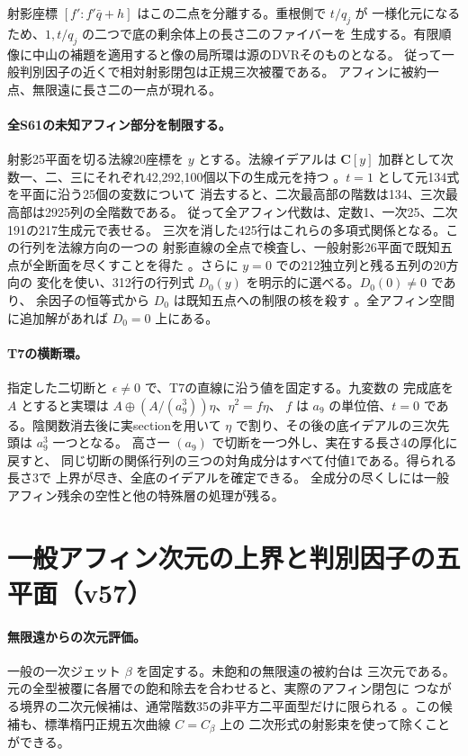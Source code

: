 \documentclass[11pt,a4paper]{ltjsarticle}
\theoremstyle{remark}
\begin{document}
射影座標 $[f':f'\bar q+h]$ はこの二点を分離する。重根側で $t/q_j$ が
一様化元になるため、$1,t/q_j$ の二つで底の剰余体上の長さ二のファイバーを
生成する。有限順像に中山の補題を適用すると像の局所環は源のDVRそのものとなる。
従って一般判別因子の近くで相対射影閉包は正規三次被覆である。
アフィンに被約一点、無限遠に長さ二の一点が現れる。

\paragraph{全S61の未知アフィン部分を制限する。}
射影25平面を切る法線20座標を $y$ とする。法線イデアルは
$\mathbf C[y]$ 加群として次数一、二、三にそれぞれ42,292,100個以下の生成元を持つ
\cite{normal-module-v56}。$t=1$ として元134式を平面に沿う25個の変数について
消去すると、二次最高部の階数は134、三次最高部は2925列の全階数である。
従って全アフィン代数は、定数1、一次25、二次191の217生成元で表せる。
三次を消した425行はこれらの多項式関係となる。この行列を法線方向の一つの
射影直線の全点で検査し、一般射影26平面で既知五点が全断面を尽くすことを得た
\cite{affine-border-v56}。さらに $y=0$ での212独立列と残る五列の20方向の
変化を使い、312行の行列式 $D_0(y)$ を明示的に選べる。$D_0(0)\ne0$ であり、
余因子の恒等式から $D_0$ は既知五点への制限の核を殺す
\cite{affine-ann-v56}。全アフィン空間に追加解があれば $D_0=0$ 上にある。

\paragraph{T7の横断環。}
指定した二切断と $\epsilon\ne0$ で、T7の直線に沿う値を固定する。九変数の
完成底を $A$ とすると実環は $A\oplus(A/(a_9^3))\eta$、$\eta^2=f\eta$、
$f$ は $a_9$ の単位倍、$t=0$ である。陰関数消去後に実sectionを用いて
$\eta$ で割り、その後の底イデアルの三次先頭は $a_9^3$ 一つとなる。
高さ一 $(a_9)$ で切断を一つ外し、実在する長さ4の厚化に戻すと、
同じ切断の関係行列の三つの対角成分はすべて付値1である。得られる長さ3で
上界が尽き、全底のイデアルを確定できる\cite{t7-nine-v56,t7-dvr-v56}。
全成分の尽くしには一般アフィン残余の空性と他の特殊層の処理が残る。

\section{一般アフィン次元の上界と判別因子の五平面（v57）}
\paragraph{無限遠からの次元評価。}
一般の一次ジェット $\beta$ を固定する。未飽和の無限遠の被約台は
三次元である。元の全型被覆に各層での飽和除去を合わせると、実際のアフィン閉包に
つながる境界の二次元候補は、通常階数35の非平方二平面型だけに限られる
\cite{bound-three-v57}。この候補も、標準楕円正規五次曲線 $C=C_\beta$ 上の
二次形式の射影束を使って除くことができる。
\end{document}
